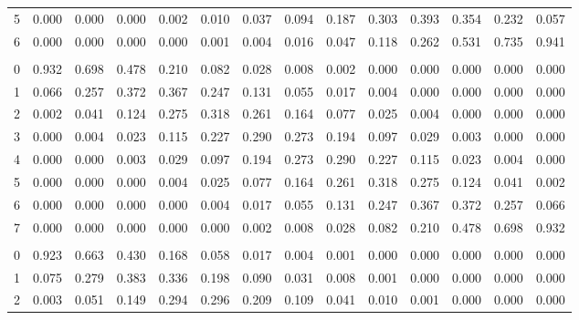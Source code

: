 \documentclass[
]{article}
\begin{document}
\begin{longtable}[t]{lrrrrrrrrrrrrr}
\hspace{1em}5 & 0.000 & 0.000 & 0.000 & 0.002 & 0.010 & 0.037 & 0.094 & 0.187 & 0.303 & 0.393 & 0.354 & 0.232 & 0.057\\
\hspace{1em}6 & 0.000 & 0.000 & 0.000 & 0.000 & 0.001 & 0.004 & 0.016 & 0.047 & 0.118 & 0.262 & 0.531 & 0.735 & 0.941\\
\addlinespace[0.3em]
\multicolumn{14}{l}{$n=7$}\\
\hspace{1em}0 & 0.932 & 0.698 & 0.478 & 0.210 & 0.082 & 0.028 & 0.008 & 0.002 & 0.000 & 0.000 & 0.000 & 0.000 & 0.000\\
\hspace{1em}1 & 0.066 & 0.257 & 0.372 & 0.367 & 0.247 & 0.131 & 0.055 & 0.017 & 0.004 & 0.000 & 0.000 & 0.000 & 0.000\\
\hspace{1em}2 & 0.002 & 0.041 & 0.124 & 0.275 & 0.318 & 0.261 & 0.164 & 0.077 & 0.025 & 0.004 & 0.000 & 0.000 & 0.000\\
\hspace{1em}3 & 0.000 & 0.004 & 0.023 & 0.115 & 0.227 & 0.290 & 0.273 & 0.194 & 0.097 & 0.029 & 0.003 & 0.000 & 0.000\\
\hspace{1em}4 & 0.000 & 0.000 & 0.003 & 0.029 & 0.097 & 0.194 & 0.273 & 0.290 & 0.227 & 0.115 & 0.023 & 0.004 & 0.000\\
\hspace{1em}5 & 0.000 & 0.000 & 0.000 & 0.004 & 0.025 & 0.077 & 0.164 & 0.261 & 0.318 & 0.275 & 0.124 & 0.041 & 0.002\\
\hspace{1em}6 & 0.000 & 0.000 & 0.000 & 0.000 & 0.004 & 0.017 & 0.055 & 0.131 & 0.247 & 0.367 & 0.372 & 0.257 & 0.066\\
\hspace{1em}7 & 0.000 & 0.000 & 0.000 & 0.000 & 0.000 & 0.002 & 0.008 & 0.028 & 0.082 & 0.210 & 0.478 & 0.698 & 0.932\\
\addlinespace[0.3em]
\multicolumn{14}{l}{$n=8$}\\
\hspace{1em}0 & 0.923 & 0.663 & 0.430 & 0.168 & 0.058 & 0.017 & 0.004 & 0.001 & 0.000 & 0.000 & 0.000 & 0.000 & 0.000\\
\hspace{1em}1 & 0.075 & 0.279 & 0.383 & 0.336 & 0.198 & 0.090 & 0.031 & 0.008 & 0.001 & 0.000 & 0.000 & 0.000 & 0.000\\
\hspace{1em}2 & 0.003 & 0.051 & 0.149 & 0.294 & 0.296 & 0.209 & 0.109 & 0.041 & 0.010 & 0.001 & 0.000 & 0.000 & 0.000\\

\end{longtable}
\end{document}
